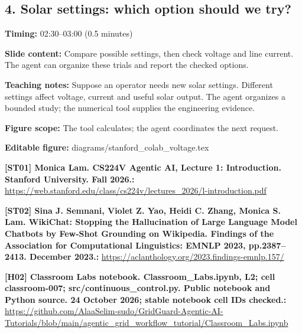 \documentclass[10pt,letterpaper]{article}
\begin{document}
\subsection*{4. Solar settings: which option should we try?}
\textbf{Timing:} 02:30--03:00 (0.5 minutes)\par
\textbf{Slide content:} Compare possible settings, then check voltage and line current.
The agent can organize these trials and report the checked options.\par
\textbf{Teaching notes:} Suppose an operator needs new solar settings. Different settings affect voltage, current and useful solar output. The agent organizes a bounded study; the numerical tool supplies the engineering evidence.\par
\textbf{Figure scope:} The tool calculates; the agent coordinates the next request.\par
\textbf{Editable figure:} diagrams/stanford\_colab\_voltage.tex\par
\textbf{[ST01] Monica Lam. CS224V Agentic AI, Lecture 1: Introduction. Stanford University. Fall 2026.:} \href{https://web.stanford.edu/class/cs224v/lectures_2026/l-introduction.pdf}{\small\ttfamily https:/\allowbreak{}/\allowbreak{}web.\allowbreak{}stanford.\allowbreak{}edu/\allowbreak{}class/\allowbreak{}cs224v/\allowbreak{}lectures\_\allowbreak{}2026/\allowbreak{}l-\allowbreak{}introduction.\allowbreak{}pdf}\par
\textbf{[ST02] Sina J. Semnani, Violet Z. Yao, Heidi C. Zhang, Monica S. Lam. WikiChat: Stopping the Hallucination of Large Language Model Chatbots by Few-Shot Grounding on Wikipedia. Findings of the Association for Computational Linguistics: EMNLP 2023, pp.2387--2413. December 2023.:} \href{https://aclanthology.org/2023.findings-emnlp.157/}{\small\ttfamily https:/\allowbreak{}/\allowbreak{}aclanthology.\allowbreak{}org/\allowbreak{}2023.\allowbreak{}findings-\allowbreak{}emnlp.\allowbreak{}157/\allowbreak{}}\par
\textbf{[H02] Classroom Labs notebook. Classroom\_Labs.ipynb, L2; cell classroom-007; src/continuous\_control.py. Public notebook and Python source. 24 October 2026; stable notebook cell IDs checked.:} \href{https://github.com/AlaaSelim-sudo/GridGuard-Agentic-AI-Tutorials/blob/main/agentic_grid_workflow_tutorial/Classroom_Labs.ipynb}{\small\ttfamily https:/\allowbreak{}/\allowbreak{}github.\allowbreak{}com/\allowbreak{}AlaaSelim-\allowbreak{}sudo/\allowbreak{}GridGuard-\allowbreak{}Agentic-\allowbreak{}AI-\allowbreak{}Tutorials/\allowbreak{}blob/\allowbreak{}main/\allowbreak{}agentic\_\allowbreak{}grid\_\allowbreak{}workflow\_\allowbreak{}tutorial/\allowbreak{}Classroom\_\allowbreak{}Labs.\allowbreak{}ipynb}\par
\end{document}
